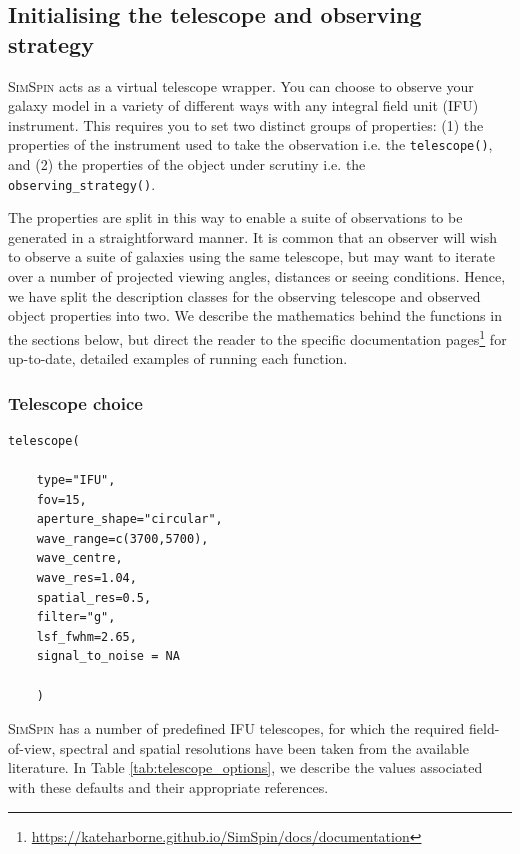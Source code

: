 \documentclass[
  journal=pasa,
  manuscript=research-paper, %
  year=2020,
  volume=37,
]{cup-journal}
\newcommand{\simspin}[1]{\textsc{SimSpin}#1} %
\newcommand{\telescope}[1]{\texttt{telescope()}#1}
\newcommand{\observingstrategy}[1]{\texttt{observing\_strategy()}#1}
\begin{document}
\subsection{Initialising the telescope and observing strategy}

\simspin{} acts as a virtual telescope wrapper. 
You can choose to observe your galaxy model in a variety of different ways with any integral field unit (IFU) instrument. 
This requires you to set two distinct groups of properties: (1) the properties of the instrument used to take the observation i.e. the \telescope{}, and (2) the properties of the object under scrutiny i.e. the \observingstrategy{}. 

The properties are split in this way to enable a suite of observations to be generated in a straightforward manner. 
It is common that an observer will wish to observe a suite of galaxies using the same telescope, but may want to iterate over a number of projected viewing angles, distances or seeing conditions. 
Hence, we have split the description classes for the observing telescope and observed object properties into two. 
We describe the mathematics behind the functions in the sections below, but direct the reader to the specific documentation pages\footnote{\url{https://kateharborne.github.io/SimSpin/docs/documentation}} for up-to-date, detailed examples of running each function.

\subsubsection{Telescope choice}

\begin{lstlisting}[basicstyle=\fontsize{10}{8}\selectfont\ttfamily]
telescope(

    type="IFU",  
    fov=15,                             
    aperture_shape="circular", 
    wave_range=c(3700,5700),   
    wave_centre,              
    wave_res=1.04,    
    spatial_res=0.5, 
    filter="g",      
    lsf_fwhm=2.65,
    signal_to_noise = NA
    
    ) 

\end{lstlisting}

\simspin{} has a number of predefined IFU telescopes, for which the required field-of-view, spectral and spatial resolutions have been taken from the available literature. 
In Table \ref{tab:telescope_options}, we describe the values associated with these defaults and their appropriate references. 
\end{document}
